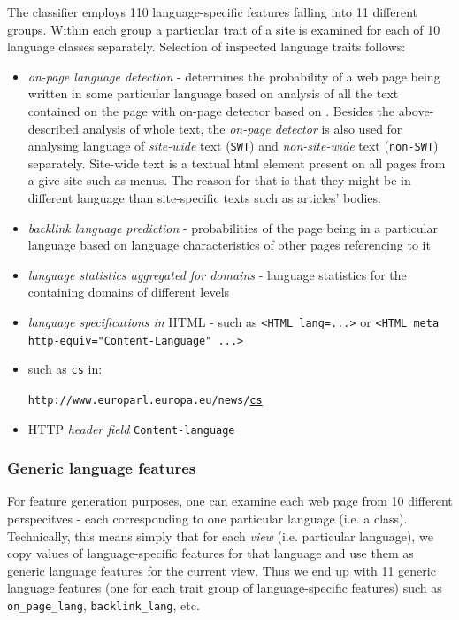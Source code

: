 \documentclass{acm_proc_article-sp}
\begin{document}
{  The classifier employs 110 language-specific features falling into 11 different  groups. Within each group a
  particular trait of a site is examined for each of 10 language classes separately. Selection of
  inspected language traits follows: 
  \begin{itemize}
    \item \textit{on-page language detection} - 
      determines the probability of a web page being written in some particular
      language based on analysis of all the text
      contained on the page with on-page detector based on \cite{Rehurek:languageidentification} . 
      Besides the above-described analysis of whole text, the \textit{on-page 
      detector} is also used for analysing language of \textit{site-wide} text (\texttt{SWT}) and
    \textit{non-site-wide} text (\texttt{non-SWT}) separately. Site-wide text is a textual html element 
    present on all pages from a give site such as menus. The reason for that is that they might be 
    in different language than site-specific texts such as articles' bodies.
    \item \textit{backlink language prediction} - probabilities of the page being in a particular
      language based on language characteristics of other pages referencing to it 
    \item \textit{language statistics aggregated for domains} - language statistics for the
      containing domains of different levels
    \item \textit{language specifications in} HTML - such as \texttt{<HTML lang=...>} or \texttt{<HTML
      meta http-equiv="Content-Language"  ...>}
    \item {} such as \texttt{cs} in:

    \texttt{http://www.europarl.europa.eu/news/}\underline{\texttt{cs}} 
    \item HTTP \textit{header field} \texttt{Content-language}
  \end{itemize}


 \subsubsection{Generic language features}
    For feature generation purposes, one can examine each web page from 10 different perspecitves -
    each corresponding to one particular language (i.e. a class).
   Technically, this means simply
    that for each \textit{view} (i.e. particular language), we copy values of language-specific
    features for that language and use them as generic language features for the current view. Thus
    we end up with 11 generic language features (one for each trait group of language-specific
    features) such as \texttt{on\_page\_lang}, \texttt{backlink\_lang}, etc.
}
\end{document}
